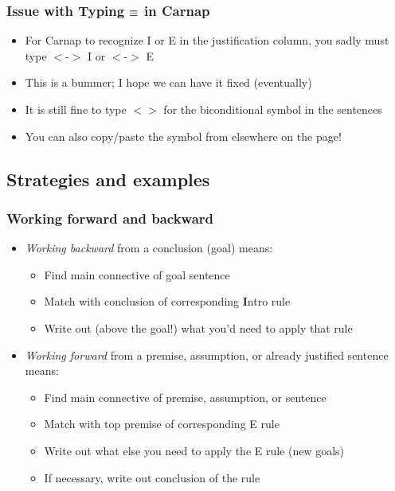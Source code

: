 \begin{frame}
\frametitle{Issue with Typing $\equiv$ in Carnap}

\begin{itemize}[<+->]

\item For Carnap to recognize \eiff I or \eiff E in the justification column, you sadly must type $<$-$>$ I or $<$-$>$ E  %

\item This is a bummer; I hope we can have it fixed (eventually)

\item It is still fine to type $<$$>$ for the biconditional symbol in the sentences

\item You can also copy/paste the \eiff symbol from elsewhere on the page! 


\end{itemize}
\end{frame}


\subsection{Strategies and examples}

\begin{frame}
  \frametitle{Working forward and backward}

  \begin{itemize}[<+->]
    \item \emph{Working backward} from a conclusion (goal) means:
    \begin{itemize}[<+->]
      \item Find main connective of goal sentence
      \item Match with conclusion of corresponding \textbf{I}ntro rule
      \item Write out (above the goal!) what you'd need to apply that rule
    \end{itemize}
    \bigskip
    \item \emph{Working forward} from a premise, assumption, or
    already justified sentence means:
    \begin{itemize}[<+->]
      \item Find main connective of premise, assumption, or sentence
      \item Match with top premise of corresponding E rule
      \item Write out what else you need to apply the E rule (new goals)
      \item If necessary, write out conclusion of the rule
    \end{itemize}
  \end{itemize}
\end{frame}

